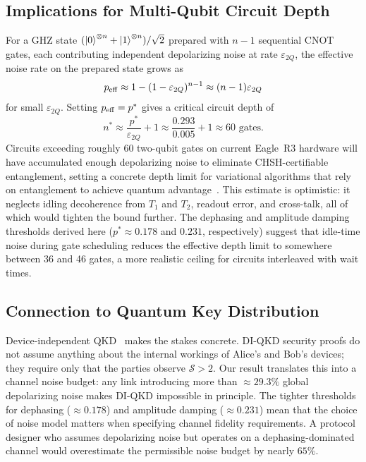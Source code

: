 \documentclass[12pt]{article}
\newcommand{\pstar}{p^*}
\newcommand{\bigS}{\mathcal{S}}
\begin{document}
\subsection{Implications for Multi-Qubit Circuit Depth}
\label{subsec:discuss_depth}

For a GHZ state $(\ket{0}^{\otimes n} + \ket{1}^{\otimes n})/\sqrt{2}$ prepared with $n-1$
sequential CNOT gates, each contributing independent depolarizing noise at rate $\varepsilon_{2Q}$,
the effective noise rate on the prepared state grows as
\begin{equation}
  p_{\rm eff} \approx 1 - (1-\varepsilon_{2Q})^{n-1} \approx (n-1)\varepsilon_{2Q}
  \label{eq:accumulated_noise}
\end{equation}
for small $\varepsilon_{2Q}$.
Setting $p_{\rm eff} = \pstar$ gives a critical circuit depth of
\begin{equation}
  n^* \approx \frac{\pstar}{\varepsilon_{2Q}} + 1 \approx \frac{0.293}{0.005} + 1 \approx 60 \text{ gates}.
  \label{eq:critical_depth}
\end{equation}
Circuits exceeding roughly 60 two-qubit gates on current Eagle~R3 hardware will have accumulated
enough depolarizing noise to eliminate CHSH-certifiable entanglement, setting a concrete depth
limit for variational algorithms that rely on entanglement to achieve quantum advantage~\cite{bharti2022noisy}.
This estimate is optimistic: it neglects idling decoherence from $T_1$ and $T_2$, readout error,
and cross-talk, all of which would tighten the bound further.
The dephasing and amplitude damping thresholds derived here ($\pstar \approx 0.178$ and
$0.231$, respectively) suggest that idle-time noise during gate scheduling reduces the effective
depth limit to somewhere between 36 and 46 gates, a more realistic ceiling for circuits
interleaved with wait times.

\subsection{Connection to Quantum Key Distribution}
\label{subsec:discuss_qkd}

Device-independent QKD~\cite{acin2007} makes the stakes concrete.
DI-QKD security proofs do not assume anything about the internal workings of Alice's and Bob's
devices; they require only that the parties observe $\bigS > 2$.
Our result translates this into a channel noise budget: any link introducing more than
$\approx 29.3\%$ global depolarizing noise makes DI-QKD impossible in principle.
The tighter thresholds for dephasing ($\approx 0.178$) and amplitude damping ($\approx 0.231$)
mean that the choice of noise model matters when specifying channel fidelity requirements.
A protocol designer who assumes depolarizing noise but operates on a dephasing-dominated channel
would overestimate the permissible noise budget by nearly $65\%$.
\end{document}
